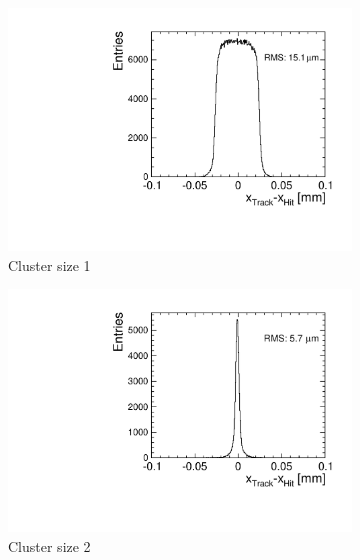 \begin{figure}[htbp] \centering
  \begin{subfigure}[b]{0.23\textwidth}
    \includegraphics[width=\textwidth]{./figures/TestBeam/residual_1hit_W19_G7.pdf}
    \caption{Cluster size 1}
  \end{subfigure} \hfill
  \begin{subfigure}[b]{0.23\textwidth}
    \includegraphics[width=\textwidth]{./figures/TestBeam/residual_2hit_W19_G7.pdf}
    \caption{Cluster size 2}
  \end{subfigure} \hfill
  \begin{subfigure}[b]{0.23\textwidth}

\end{subfigure}
\end{figure}
